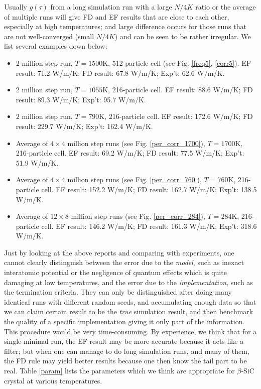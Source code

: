 Usually $g(\tau)$ from a long simulation run with a large $N/4K$ ratio
or the average of multiple runs will give FD and EF results that are
close to each other, especially at high temperatures; and large
difference occurs for those runs that are not well-converged (small
$N/4K$) and can be seen to be rather irregular. We list several
examples down below:

\begin{itemize}
  
\item 2 million step run, $T=1500$K, 512-particle cell (see Fig.
  \ref{freq5}, \ref{corr5}). EF result: 71.2 W/m/K; FD result: 67.8
  W/m/K; Exp't: 62.6 W/m/K.
  
\item 2 million step run, $T=1055$K, 216-particle cell.  EF
  result: 88.6 W/m/K; FD result: 89.3 W/m/K; Exp't: 95.7 W/m/K.

\item 2 million step run, $T=790$K, 216-particle cell. EF result:
  172.6 W/m/K; FD result: 229.7 W/m/K; Exp't:  162.4 W/m/K.
  
\item Average of $4\times 4$ million step runs (see Fig.
  \ref{per_corr_1700}),  $T=1700$K, 216-particle cell. EF result:
  69.2 W/m/K; FD result: 77.5 W/m/K; Exp't: 51.9 W/m/K.
  
\item Average of $4\times 4$ million step runs (see Fig.
  \ref{per_corr_760}),  $T=760$K, 216-particle cell. EF result:
  152.2 W/m/K; FD result: 162.7 W/m/K; Exp't: 138.5 W/m/K.
  
\item Average of $12\times 8$ million step runs (see Fig.
  \ref{per_corr_284}),  $T=284$K, 216-particle cell. EF result:
  146.2 W/m/K; FD result: 161.3 W/m/K; Exp't: 318.6 W/m/K.

\end{itemize}

Just by looking at the above reports and comparing with experiments,
one cannot clearly distinguish between the error due to the {\em
  model}, such as inexact interatomic potential or the negligence of
quantum effects which is quite damaging at low temperatures\cite{Li},
and the error due to the {\em implementation}, such as the termination
criteria. They can only be distinguished after doing many identical
runs with different random seeds, and accumulating enough data so that
we can claim certain result to be the {\em true} simulation result,
and then benchmark the quality of a specific implementation giving it
only part of the information. This procedure would be very 
time-consuming.  By experience, we think that for a single minimal
run, the EF result may be more accurate because it acts like a filter;
but when one can manage to do long simulation runs, and many of them,
the FD rule may yield better results because one then know the tail
part to be real. Table \ref{param} lists the parameters which we think
are appropriate for $\beta$-SiC crystal at various temperatures.

